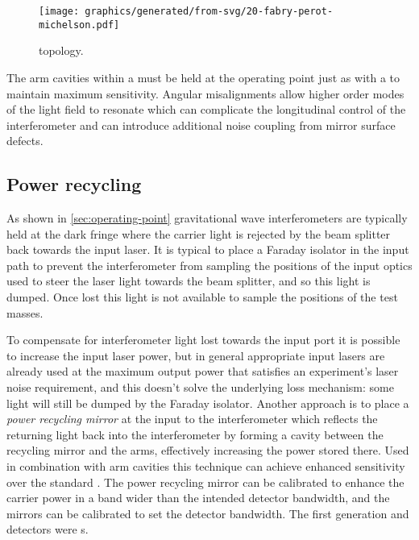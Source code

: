 \begin{figure}
  \centering
  \texttt{[image: graphics/generated/from-svg/20-fabry-perot-michelson.pdf]}
  \caption[\FPMI{}]{\label{fig:fpmi}\FPMI{} topology.}
\end{figure}

The arm cavities within a \FPMI{} must be held at the operating point just as with a \MI{} to maintain maximum sensitivity. Angular misalignments allow higher order modes of the light field to resonate which can complicate the longitudinal control of the interferometer and can introduce additional noise coupling from mirror surface defects.

\subsection{\label{sec:power-recycling}Power recycling}
As shown in \cref{sec:operating-point} gravitational wave interferometers are typically held at the dark fringe where the carrier light is rejected by the beam splitter back towards the input laser. It is typical to place a Faraday isolator in the input path to prevent the interferometer from sampling the positions of the input optics used to steer the laser light towards the beam splitter, and so this light is dumped. Once lost this light is not available to sample the positions of the test masses.

To compensate for interferometer light lost towards the input port it is possible to increase the input laser power, but in general appropriate input lasers are already used at the maximum output power that satisfies an experiment's laser noise requirement, and this doesn't solve the underlying loss mechanism: some light will still be dumped by the Faraday isolator. Another approach is to place a \emph{power recycling mirror} at the input to the interferometer which reflects the returning light back into the interferometer by forming a cavity between the recycling mirror and the arms, effectively increasing the power stored there. Used in combination with \FP{} arm cavities this technique can achieve enhanced sensitivity over the standard \MI{}. The power recycling mirror can be calibrated to enhance the carrier power in a band wider than the intended detector bandwidth, and the \FP{} mirrors can be calibrated to set the detector bandwidth. The first generation \ILIGO{} and \IVIRGO{} detectors were \PRFPMI{}s.

